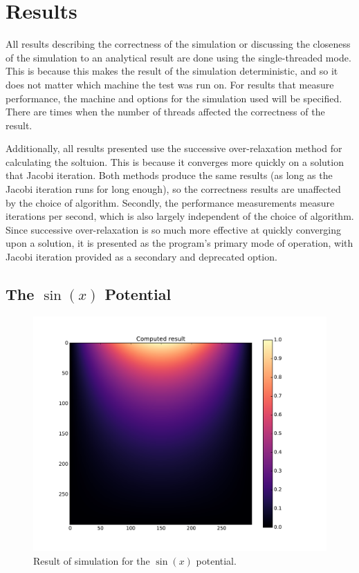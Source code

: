 \section{Results}

All results describing the correctness of the simulation or discussing the closeness of the simulation to an analytical
result are done using the single-threaded mode. This is because this makes the result of the simulation deterministic,
and so it does not matter which machine the test was run on. For results that measure performance, the machine and options
for the simulation used will be specified. There are times when the number of threads affected the correctness of the
result.

Additionally, all results presented use the successive over-relaxation method for calculating the soltuion. This is because
it converges more quickly on a solution that Jacobi iteration. Both methods produce the same results (as long as the Jacobi
iteration runs for long enough), so the correctness results are unaffected by the choice of algorithm. Secondly, the performance
measurements measure iterations per second, which is also largely independent of the choice of algorithm. Since successive
over-relaxation is so much more effective at quickly converging upon a solution, it is presented as the program's primary
mode of operation, with Jacobi iteration provided as a secondary and deprecated option.

\subsection{The $\sin(x)$ Potential}

	\begin{figure}[h]
	\centering
	\includegraphics[width=1.1\linewidth]{sin300_calc.pdf}
	\caption{Result of simulation for the $\sin(x)$ potential.} 
	\label{fig:sin-result}
	\end{figure}

